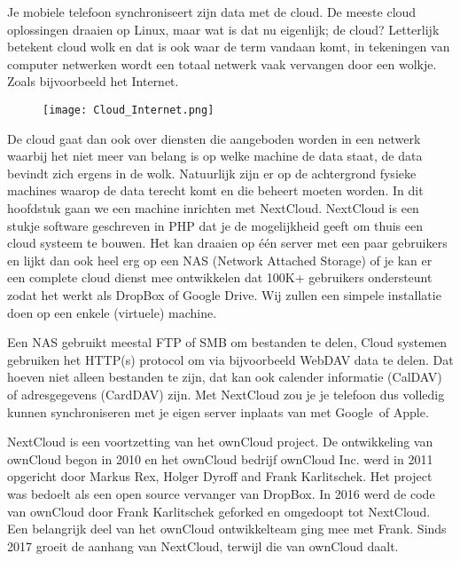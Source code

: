 Je mobiele telefoon synchroniseert zijn data met de cloud. De meeste cloud oplossingen draaien op Linux, maar wat is dat nu eigenlijk; de cloud? Letterlijk betekent cloud wolk en dat is ook waar de term vandaan komt, in tekeningen van computer netwerken wordt een totaal netwerk vaak vervangen door een wolkje. Zoals bijvoorbeeld het Internet.

\begin{figure}
\texttt{[image: Cloud\_Internet.png]}
\end{figure}

De cloud gaat dan ook over diensten die aangeboden worden in een netwerk waarbij het niet meer van belang is op welke machine de data staat, de data bevindt zich ergens in de wolk. Natuurlijk zijn er op de achtergrond fysieke machines waarop de data terecht komt en die beheert moeten worden. In dit hoofdstuk gaan we een machine inrichten met NextCloud. NextCloud is een stukje software geschreven in PHP dat je de mogelijkheid geeft om thuis een cloud systeem te bouwen. Het kan draaien op \'e\'en server met een paar gebruikers en lijkt dan ook heel erg op een NAS (Network Attached Storage) of je kan er een complete cloud dienst mee ontwikkelen dat 100K+ gebruikers ondersteunt zodat het werkt als DropBox of Google Drive. Wij zullen een simpele installatie doen op een enkele (virtuele) machine.

Een NAS gebruikt meestal FTP of SMB om bestanden te delen, Cloud systemen gebruiken het HTTP(s) protocol om via bijvoorbeeld WebDAV data te delen. Dat hoeven niet alleen bestanden te zijn, dat kan ook calender informatie (CalDAV) of adresgegevens (CardDAV) zijn. Met NextCloud zou je je telefoon dus volledig kunnen synchroniseren met je eigen server inplaats van met Google\texttrademark\ of Apple\texttrademark.

NextCloud is een voortzetting van het ownCloud project. De ontwikkeling van ownCloud begon in 2010 en het ownCloud bedrijf ownCloud Inc. werd in 2011 opgericht door Markus Rex, Holger Dyroff and Frank Karlitschek. Het project was bedoelt als een open source vervanger van DropBox. In 2016 werd de code van ownCloud door Frank Karlitschek geforked en omgedoopt tot NextCloud. Een belangrijk deel van het ownCloud ontwikkelteam ging mee met Frank. Sinds 2017 groeit de aanhang van NextCloud, terwijl die van ownCloud daalt.
